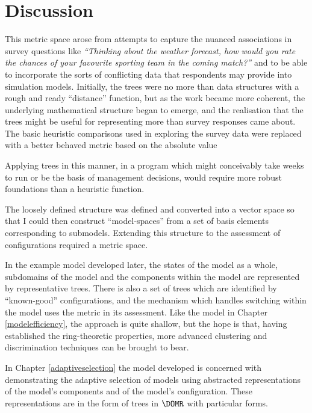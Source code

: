 \section{Discussion}

This metric space arose from attempts to capture the nuanced
associations in survey questions like \emph{``Thinking about the
  weather forecast, how would you rate the chances of your favourite
  sporting team in the coming match?''} and to be able to incorporate
the sorts of conflicting data that respondents may provide into
simulation models. Initially, the trees were no more than data
structures with a rough and ready ``distance'' function, but as the
work became more coherent, the underlying mathematical structure began
to emerge, and the realisation that the trees might be useful for
representing more than survey responses came about. The basic
heuristic comparisons used in exploring the survey data were replaced
with a better behaved metric based on the absolute value

Applying trees in
this manner, in a program which might conceivably take weeks to run or
be the basis of management decisions, would require more robust
foundations than a heuristic function.

The loosely defined structure was defined and converted into a vector
space so that I could then construct ``model-spaces'' from a set of basis
elements corresponding to submodels. Extending this structure to the
assessment of configurations required a metric space.

In the example model developed later, the states of the model as a
whole, subdomains of the model and the components within the model are
represented by representative trees.  There is also a set of trees
which are identified by ``known-good'' configurations, and the
mechanism which handles switching within the model uses the metric in
its assessment.  Like the model in Chapter \ref{modelefficiency}, the
approach is quite shallow, but the hope is that, having established
the ring-theoretic properties, more advanced clustering and
discrimination techniques can be brought to bear.

In Chapter \ref{adaptiveselection} the model developed is concerned with
demonstrating the adaptive selection of models using abstracted
representations of the model's components and of the model's
configuration. These representations are in the form of trees in
$\DOMR$ with particular forms.


